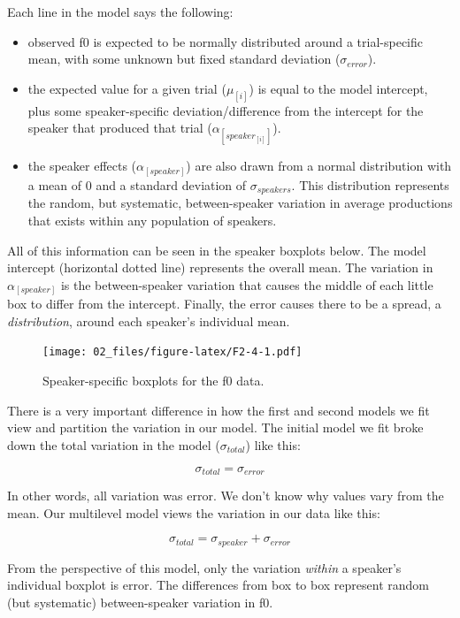 \documentclass[
]{book}
\begin{document}
Each line in the model says the following:

\begin{itemize}
\item
  observed f0 is expected to be normally distributed around a trial-specific mean, with some unknown but fixed standard deviation (\(\sigma_{error}\)).
\item
  the expected value for a given trial (\(\mu_{[i]}\)) is equal to the model intercept, plus some speaker-specific deviation/difference from the intercept for the speaker that produced that trial (\(\alpha_{[speaker_{[i]}]}\)).
\item
  the speaker effects (\(\alpha_{[speaker]}\)) are also drawn from a normal distribution with a mean of 0 and a standard deviation of \(\sigma_{speakers}\). This distribution represents the random, but systematic, between-speaker variation in average productions that exists within any population of speakers.
\end{itemize}

All of this information can be seen in the speaker boxplots below. The model intercept (horizontal dotted line) represents the overall mean. The variation in \(\alpha_{[speaker]}\) is the between-speaker variation that causes the middle of each little box to differ from the intercept. Finally, the error causes there to be a spread, a \emph{distribution}, around each speaker's individual mean.

\begin{figure}
\centering
\texttt{[image: 02\_files/figure-latex/F2-4-1.pdf]}
\caption{\label{fig:F2-4}Speaker-specific boxplots for the f0 data.}
\end{figure}

There is a very important difference in how the first and second models we fit view and partition the variation in our model. The initial model we fit broke down the total variation in the model (\(\sigma_{total}\)) like this:

\[
\sigma_{total} = \sigma_{error}
\label{eq:29}
\]

In other words, all variation was error. We don't know why values vary from the mean. Our multilevel model views the variation in our data like this:

\[
\sigma_{total} = \sigma_{speaker} + \sigma_{error}
\label{eq:210}
\]

From the perspective of this model, only the variation \emph{within} a speaker's individual boxplot is error. The differences from box to box represent random (but systematic) between-speaker variation in f0.
\end{document}
